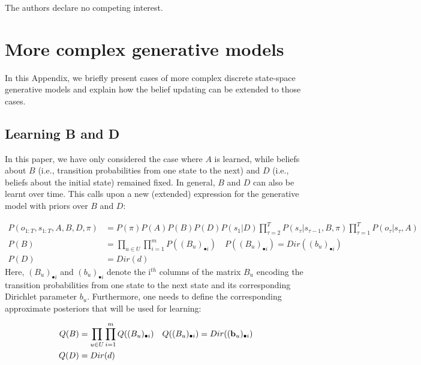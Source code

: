 \documentclass{article}
\begin{document}
The authors declare no competing interest.

\appendix

\section{More complex generative models}
\label{appendix: more complex models}

In this Appendix, we briefly present cases of more complex discrete state-space generative models and explain how the belief updating can be extended to those cases.

\subsection{Learning B and D}
\label{appendix:learning B D}

In this paper, we have only considered the case where $A$ is learned, while beliefs about $B$ (i.e., transition probabilities from one state to the next) and $D$ (i.e., beliefs about the initial state) remained fixed. In general, $B$ and $D$ can also be learnt over time. This calls upon a new (extended) expression for the generative model with priors over $B$ and $D$:

\begin{equation}
    \label{eq: gen mod with B and D}
    \begin{split}
           P(o_{1:T},s_{1:T},A,B,D,\pi) &=P(\pi) P(A)P(B)P(D)P(s_1|D)\prod_{\tau=2}^T P(s_\tau|s_{\tau-1},B, \pi) \prod_{\tau=1}^T  P(o_\tau|s_\tau,A)  \\
           P(B)&=\prod_{u\in U}\prod_{i=1}^m P((B_u)_{\bullet i})\quad P((B_u)_{\bullet i})=Dir((b_u)_{\bullet i})\\
           P(D)&=Dir(d)
    \end{split}
\end{equation}
Here, $(B_u)_{\bullet i}$ and $(b_u)_{\bullet i}$ denote the i$^{th}$ columns of the matrix $B_u$ encoding the transition probabilities from one state to the next state and its corresponding Dirichlet parameter $b_u$. Furthermore, one needs to define the corresponding approximate posteriors that will be used for learning:

\begin{equation}
    \begin{split}
        Q(B)&= \prod_{u\in U}\prod_{i=1}^m Q((B_u)_{\bullet i})\quad Q((B_u)_{\bullet i})=Dir((\bold b_u)_{\bullet i}) \\
        Q(D)&= Dir(d)
    \end{split}
\end{equation}
 
\end{document}
